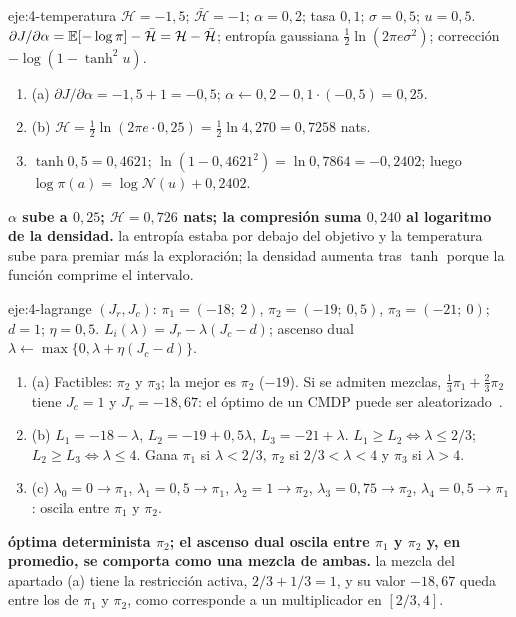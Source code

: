 \begin{solucion}{eje:4-temperatura}
\datos $\mathcal H=-1{,}5$; $\bar{\mathcal H}=-1$; $\alpha=0{,}2$; tasa $0{,}1$; $\sigma=0{,}5$; $u=0{,}5$.
\planteamiento $\partial J/\partial\alpha=\mathbb{E}[-\log\pi]-\bar{\mathcal H}=\mathcal H-\bar{\mathcal H}$; entropía gaussiana $\frac12\ln(2\pi e\sigma^{2})$; corrección $-\log(1-\tanh^{2}u)$.
\pasos
\begin{enumerate}[label=\arabic*.]
  \item (a) $\partial J/\partial\alpha=-1{,}5+1=-0{,}5$; $\alpha\leftarrow0{,}2-0{,}1\cdot(-0{,}5)=0{,}25$.
  \item (b) $\mathcal H=\frac12\ln(2\pi e\cdot0{,}25)=\frac12\ln4{,}270=0{,}7258$ nats.
  \item $\tanh0{,}5=0{,}4621$; $\ln(1-0{,}4621^{2})=\ln0{,}7864=-0{,}2402$; luego $\log\pi(a)=\log\mathcal N(u)+0{,}2402$.
\end{enumerate}
\resultado \textbf{$\alpha$ sube a $0{,}25$; $\mathcal H=0{,}726$ nats; la compresión suma $0{,}240$ al logaritmo de la densidad.}
\comprobacion la entropía estaba por debajo del objetivo y la temperatura sube para premiar más la exploración; la densidad aumenta tras $\tanh$ porque la función comprime el intervalo.
\end{solucion}

\begin{solucion}{eje:4-lagrange}
\datos $(J_r,J_c)$: $\pi_1=(-18;\ 2)$, $\pi_2=(-19;\ 0{,}5)$, $\pi_3=(-21;\ 0)$; $d=1$; $\eta=0{,}5$.
\planteamiento $L_i(\lambda)=J_r-\lambda(J_c-d)$; ascenso dual $\lambda\leftarrow\max\{0,\lambda+\eta(J_c-d)\}$.
\pasos
\begin{enumerate}[label=\arabic*.]
  \item (a) Factibles: $\pi_2$ y $\pi_3$; la mejor es $\pi_2$ ($-19$). Si se admiten mezclas, $\frac13\pi_1+\frac23\pi_2$ tiene $J_c=1$ y $J_r=-18{,}67$: el óptimo de un CMDP puede ser aleatorizado~\cite{altman}.
  \item (b) $L_1=-18-\lambda$, $L_2=-19+0{,}5\lambda$, $L_3=-21+\lambda$. $L_1\ge L_2\iff\lambda\le2/3$; $L_2\ge L_3\iff\lambda\le4$. Gana $\pi_1$ si $\lambda<2/3$, $\pi_2$ si $2/3<\lambda<4$ y $\pi_3$ si $\lambda>4$.
  \item (c) $\lambda_0=0\to\pi_1$, $\lambda_1=0{,}5\to\pi_1$, $\lambda_2=1\to\pi_2$, $\lambda_3=0{,}75\to\pi_2$, $\lambda_4=0{,}5\to\pi_1$: oscila entre $\pi_1$ y $\pi_2$.
\end{enumerate}
\resultado \textbf{óptima determinista $\pi_2$; el ascenso dual oscila entre $\pi_1$ y $\pi_2$ y, en promedio, se comporta como una mezcla de ambas.}
\comprobacion la mezcla del apartado (a) tiene la restricción activa, $2/3+1/3=1$, y su valor $-18{,}67$ queda entre los de $\pi_1$ y $\pi_2$, como corresponde a un multiplicador en $[2/3,4]$.
\end{solucion}


